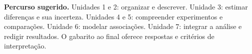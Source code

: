 \documentclass{ueap-apostila}
\begin{document}
\textbf{Percurso sugerido.} Unidades 1 e 2: organizar e descrever. Unidade 3: estimar diferenças e sua incerteza. Unidades 4 e 5: compreender experimentos e comparações. Unidade 6: modelar associações. Unidade 7: integrar a análise e redigir resultados. O gabarito ao final oferece respostas e critérios de interpretação.
\tableofcontents
\mainmatter
\fancyhead[R]{\small\textcolor{UEAPDarkGreen}{Unidade \thechapter}}







\backmatter
\fancyhead[R]{\small\textcolor{UEAPDarkGreen}{Material de consulta}}

\printbibliography[heading=bibintoc,title={Referências e leituras de apoio}]
\end{document}
